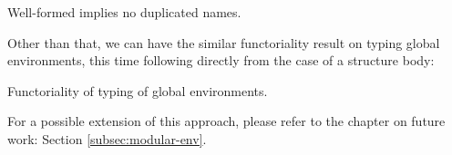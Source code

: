 \begin{listing}[H]
  \caption{Well-formed implies no duplicated names.}
  \label{lst:2-typing-nodup}
\end{listing}

Other than that, we can have the similar functoriality result on typing global
environments, this time following directly from the case of a structure body:

\begin{listing}[H]
  \caption{Functoriality of typing of global environments.}
  \label{lst:2-typing-funct}
\end{listing}

For a possible extension of this approach, please refer to the chapter on future
work: Section \ref{subsec:modular-env}.